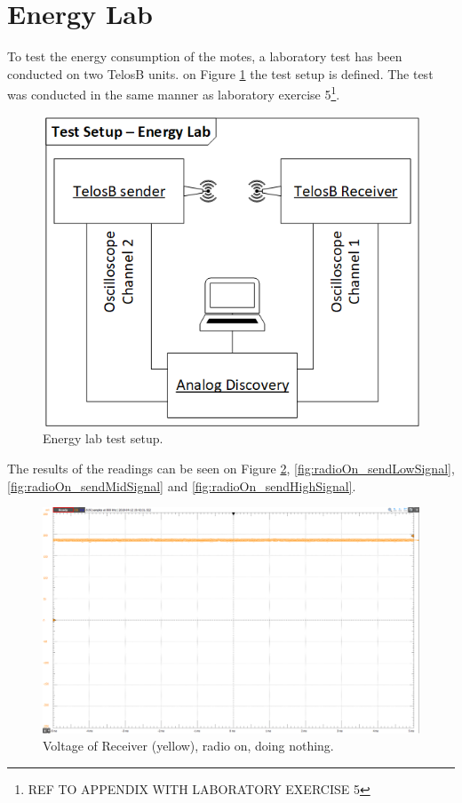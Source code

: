 \section{Energy Lab}\label{sc:energylab}

To test the energy consumption of the motes, a laboratory test has been conducted on two TelosB units. on Figure \ref{fig:energyLab_testSetup} the test setup is defined. The test was conducted in the same manner as laboratory exercise 5\footnote{REF TO APPENDIX WITH LABORATORY EXERCISE 5}.

\begin{figure}[H]
	\centering
	\includegraphics[width=0.8\linewidth]{implementation/energylab/fig/energyLab_testSetup.png}
	\caption{Energy lab test setup.}
	\label{fig:energyLab_testSetup}
\end{figure}

The results of the readings can be seen on Figure \ref{fig:radioOn_idle}, \ref{fig:radioOn_sendLowSignal}, \ref{fig:radioOn_sendMidSignal} and \ref{fig:radioOn_sendHighSignal}.

\begin{figure}[H]
	\centering
	\includegraphics[width=0.8\linewidth]{implementation/energylab/fig/radioOn_idle.png}
	\caption{Voltage of Receiver (yellow), radio on, doing nothing.}
	\label{fig:radioOn_idle}
\end{figure}

